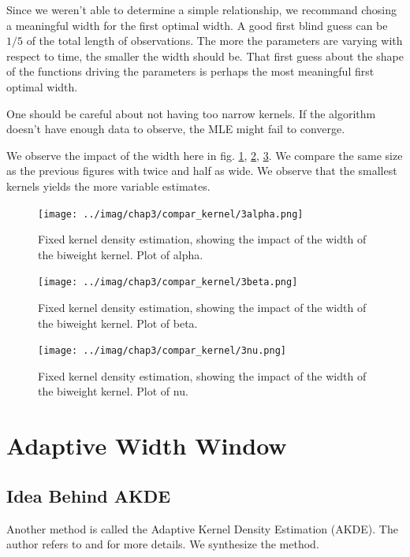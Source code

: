 \documentclass[11pt]{book}
\begin{document}
Since we weren't able to determine a simple relationship, we recommand chosing a meaningful width for the first optimal width. A good first blind guess can be $1/5$ of the total length of observations. The more the parameters are varying with respect to time, the smaller the width should be. That first guess about the shape of the functions driving the parameters is perhaps the most meaningful first optimal width.

\begin{remarque}
One should be careful about not having too narrow kernels. If the algorithm doesn't have enough data to observe, the MLE might fail to converge.
\end{remarque}

We observe the impact of the width here in fig. \ref{fig:basic_3_kernels_alpha}, \ref{fig:basic_3_kernels_beta}, \ref{fig:basic_3_kernels_nu}. We compare the same size as the previous figures with twice and half as wide. We observe that the smallest kernels yields the more variable estimates.

\begin{figure}
\centering
\texttt{[image: ../imag/chap3/compar\_kernel/3alpha.png]}
\caption{Fixed kernel density estimation, showing the impact of the width of the biweight kernel. Plot of alpha.}
\label{fig:basic_3_kernels_alpha}
\end{figure}

\begin{figure}
\centering
\texttt{[image: ../imag/chap3/compar\_kernel/3beta.png]}
\caption{Fixed kernel density estimation, showing the impact of the width of the biweight kernel. Plot of beta.}
\label{fig:basic_3_kernels_beta}
\end{figure}

\begin{figure}
\centering
\texttt{[image: ../imag/chap3/compar\_kernel/3nu.png]}
\caption{Fixed kernel density estimation, showing the impact of the width of the biweight kernel. Plot of nu.}
\label{fig:basic_3_kernels_nu}
\end{figure}




\section{Adaptive Width Window}
\subsection{Idea Behind AKDE}
Another method is called the Adaptive Kernel Density Estimation (AKDE). The author refers to \cite{Methods_ESTIM} and \cite{AKDE_ex} for more details. We synthesize the method.
\end{document}
